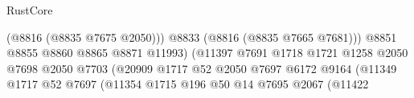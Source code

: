 \begin{lexlean}{RustCore}
\begin{coremodule}
                                                                  (@8816 (@8835 @7675 @2050)))
                                                                @8833
                                                                (@8816 (@8835 @7665 @7681)))
                                                              @8851
                                                              @8855
                                                              @8860
                                                              @8865
                                                              @8871
                                                              @11993)
                                                            (@11397
                                                              @7691
                                                              @1718
                                                              @1721
                                                              @1258
                                                              @2050
                                                              @7698
                                                              @2050
                                                              @7703
                                                              (@20909
                                                                @1717
                                                                @52
                                                                @2050
                                                                @7697
                                                                @6172
                                                                @9164
                                                                (@11349
                                                                  @1717
                                                                  @52
                                                                  @7697
                                                                  (@11354
                                                                    @1715
                                                                    @196
                                                                    @50
                                                                    @14
                                                                    @7695
                                                                    @2067
                                                                    (@11422

\end{coremodule}
\end{lexlean}
